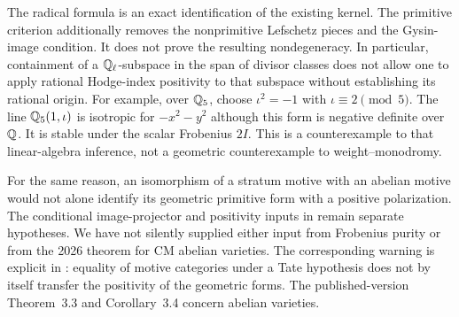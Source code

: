 \begin{remark}
\label{c:threefold-pairing-scope}
The radical formula is an exact identification of the existing
kernel.  The primitive criterion additionally removes the
nonprimitive Lefschetz pieces and the Gysin-image condition.
It does not prove the resulting nondegeneracy.
In particular, containment of a $\mathbb Q_\ell$-subspace in the span
of divisor classes does not allow one to apply rational
Hodge-index positivity to that subspace without establishing
its rational origin.  For example, over $\mathbb Q_5$, choose
$\iota^2=-1$ with $\iota\equiv2\pmod5$.
The line $\mathbb Q_5(1,\iota)$ is isotropic for $-x^2-y^2$ although
this form is negative definite over $\mathbb Q$.
It is stable under the scalar Frobenius $2I$.
This is a counterexample to that linear-algebra inference,
not a geometric counterexample to weight--monodromy.

For the same reason, an isomorphism of a stratum motive with
an abelian motive would not alone identify its geometric
primitive form with a positive polarization.  The conditional
image-projector and positivity inputs in
\citet[Theorem~0.4 and \S\S4.1--4.3]{c_msaito2003positivity}
remain separate hypotheses.  We have not silently supplied
either input from Frobenius purity or from the 2026 theorem
for CM abelian varieties.
The corresponding warning is explicit in
\citet[submitted version, Remark~4.10 and footnote~3,
p.~14]{DMilne2002Polarizations}: equality of motive categories
under a Tate hypothesis does not by itself transfer the
positivity of the geometric forms.  The published-version
Theorem~3.3 and Corollary~3.4 concern abelian varieties.
\end{remark}

